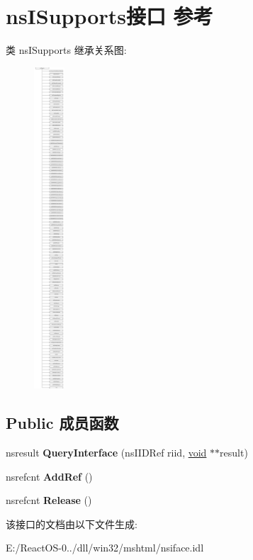 \hypertarget{interfacens_i_supports}{}\section{ns\+I\+Supports接口 参考}
\label{interfacens_i_supports}
类 ns\+I\+Supports 继承关系图\+:\begin{figure}[H]
\begin{center}
\leavevmode
\includegraphics[height=12.000000cm]{interfacens_i_supports}
\end{center}
\end{figure}
\subsection*{Public 成员函数}
\begin{DoxyCompactItemize}
\item 
\mbox{\label{interfacens_i_supports_a1bd61f975ef8fe6502b98ce0acfe6d22}} 
nsresult {\bfseries Query\+Interface} (ns\+I\+I\+D\+Ref riid, \hyperlink{interfacevoid}{void} $\ast$$\ast$result)
\item 
\mbox{\label{interfacens_i_supports_a7d0af96b0bef2410ae261c87ddae2201}} 
nsrefcnt {\bfseries Add\+Ref} ()
\item 
\mbox{\label{interfacens_i_supports_a9932603e1d893faf9e9b7b899b2147bf}} 
nsrefcnt {\bfseries Release} ()
\end{DoxyCompactItemize}


该接口的文档由以下文件生成\+:\begin{DoxyCompactItemize}
\item 
E\+:/\+React\+O\+S-\/0../dll/win32/mshtml/nsiface.\+idl\end{DoxyCompactItemize}
